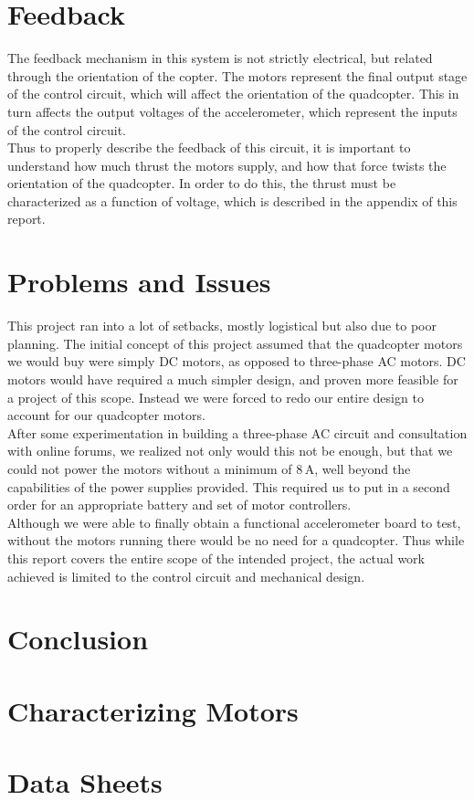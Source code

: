 \documentclass[11pt]{article} %
\begin{document}
\section{Feedback}
The feedback mechanism in this system is not strictly electrical, but related through the orientation of the copter. The motors represent the final output stage of the control circuit, which will affect the orientation of the quadcopter. This in turn affects the output voltages of the accelerometer, which represent the inputs of the control circuit.\\
Thus to properly describe the feedback of this circuit, it is important to understand how much thrust the motors supply, and how that force twists the orientation of the quadcopter. In order to do this, the thrust must be characterized as a function of voltage, which is described in the appendix of this report.

\section{Problems and Issues}
This project ran into a lot of setbacks, mostly logistical but also due to poor planning. The initial concept of this project assumed that the quadcopter motors we would buy were simply DC motors, as opposed to three-phase AC motors. DC motors would have required a much simpler design, and proven more feasible for a project of this scope. Instead we were forced to redo our entire design to account for our quadcopter motors.\\
After some experimentation in building a three-phase AC circuit and consultation with online forums, we realized not only would this not be enough, but that we could not power the motors without a minimum of 8\,A, well beyond the capabilities of the power supplies provided. This required us to put in a second order for an appropriate battery and set of motor controllers.\\
Although we were able to finally obtain a functional accelerometer board to test, without the motors running there would be no need for a quadcopter. Thus while this report covers the entire scope of the intended project, the actual work achieved is limited to the control circuit and mechanical design.
\section{Conclusion}

\appendix
\section{Characterizing Motors}

\section{Data Sheets}
\end{document}
